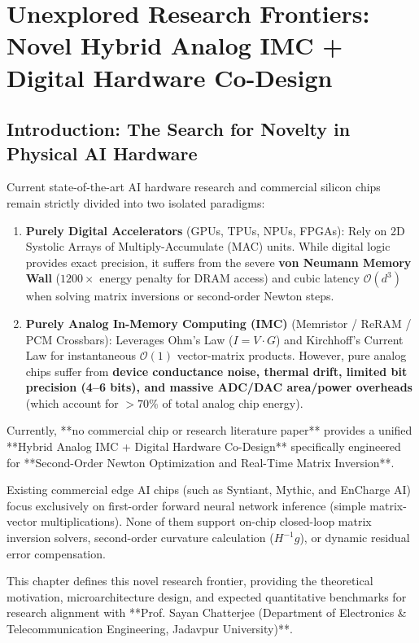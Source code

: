 \chapter{Unexplored Research Frontiers: Novel Hybrid Analog IMC + Digital Hardware Co-Design}
\label{ch:novelty_hybrid}

\section{Introduction: The Search for Novelty in Physical AI Hardware}
Current state-of-the-art AI hardware research and commercial silicon chips remain strictly divided into two isolated paradigms:
\begin{enumerate}[leftmargin=*]
    \item \textbf{Purely Digital Accelerators} (GPUs, TPUs, NPUs, FPGAs): Rely on 2D Systolic Arrays of Multiply-Accumulate (MAC) units. While digital logic provides exact precision, it suffers from the severe \textbf{von Neumann Memory Wall} ($1200\times$ energy penalty for DRAM access) and cubic latency $\mathcal{O}(d^3)$ when solving matrix inversions or second-order Newton steps.
    \item \textbf{Purely Analog In-Memory Computing (IMC)} (Memristor / ReRAM / PCM Crossbars): Leverages Ohm's Law ($I = V \cdot G$) and Kirchhoff's Current Law for instantaneous $\mathcal{O}(1)$ vector-matrix products. However, pure analog chips suffer from \textbf{device conductance noise, thermal drift, limited bit precision (4--6 bits), and massive ADC/DAC area/power overheads} (which account for $>70\%$ of total analog chip energy).
\end{enumerate}

\begin{conceptbox}
Currently, **no commercial chip or research literature paper** provides a unified **Hybrid Analog IMC + Digital Hardware Co-Design** specifically engineered for **Second-Order Newton Optimization and Real-Time Matrix Inversion**.

Existing commercial edge AI chips (such as Syntiant, Mythic, and EnCharge AI) focus exclusively on first-order forward neural network inference (simple matrix-vector multiplications). None of them support on-chip closed-loop matrix inversion solvers, second-order curvature calculation ($H^{-1} g$), or dynamic residual error compensation.

This chapter defines this novel research frontier, providing the theoretical motivation, microarchitecture design, and expected quantitative benchmarks for research alignment with **Prof. Sayan Chatterjee (Department of Electronics \& Telecommunication Engineering, Jadavpur University)**.
\end{conceptbox}

